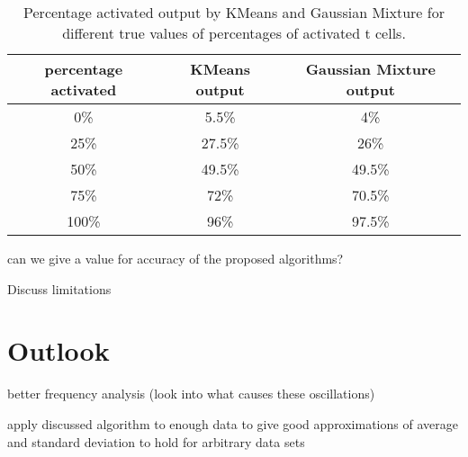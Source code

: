 \begin{table}[h]
	\centering
	\begin{tabular}{|c|c|c|}
		\hline
		percentage activated & KMeans output & Gaussian Mixture output\\
		\hline
		0\% & 5.5\% & 4\%\\
		\hline
		25\% & 27.5\% & 26\%\\
		\hline
		50\% & 49.5\% & 49.5\%\\
		\hline
		75\% & 72\% & 70.5\%\\
		\hline
		100\% & 96\% & 97.5\%\\
		\hline
	\end{tabular}
	\caption{Percentage activated output by KMeans and Gaussian Mixture for different true values of percentages of activated t cells.}
	\label{tab:accuracy}
\end{table}


can we give a value for accuracy of the proposed algorithms?

Discuss limitations

\section{Outlook}

better frequency analysis (look into what causes these oscillations)

apply discussed algorithm to enough data to give good approximations of average and standard deviation to hold for arbitrary data sets